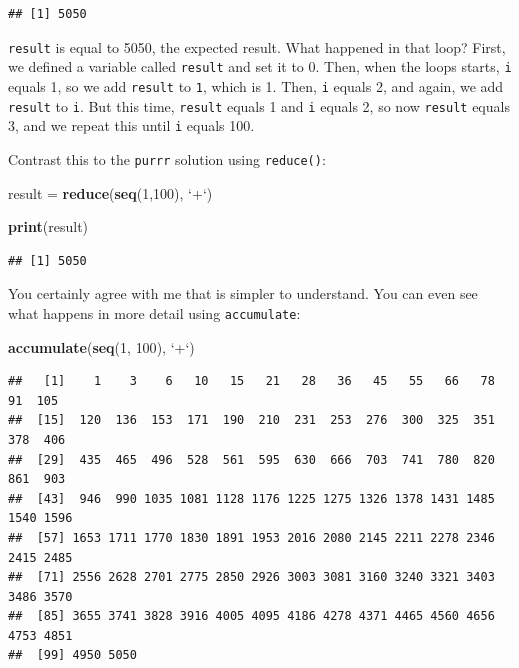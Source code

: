 \documentclass[]{gitbook}
\newenvironment{Shaded}{\begin{snugshade}}{\end{snugshade}}
\newcommand{\DataTypeTok}[1]{\textcolor[rgb]{0.13,0.29,0.53}{#1}}
\newcommand{\DecValTok}[1]{\textcolor[rgb]{0.00,0.00,0.81}{#1}}
\newcommand{\KeywordTok}[1]{\textcolor[rgb]{0.13,0.29,0.53}{\textbf{#1}}}
\newcommand{\NormalTok}[1]{#1}
\newcommand{\StringTok}[1]{\textcolor[rgb]{0.31,0.60,0.02}{#1}}
\theoremstyle{definition}
\theoremstyle{definition}
\theoremstyle{definition}
\theoremstyle{remark}
\begin{document}
\begin{verbatim}
## [1] 5050
\end{verbatim}

\texttt{result} is equal to 5050, the expected result. What happened in
that loop? First, we defined a variable called \texttt{result} and set
it to 0. Then, when the loops starts, \texttt{i} equals 1, so we add
\texttt{result} to \texttt{1}, which is 1. Then, \texttt{i} equals 2,
and again, we add \texttt{result} to \texttt{i}. But this time,
\texttt{result} equals 1 and \texttt{i} equals 2, so now \texttt{result}
equals 3, and we repeat this until \texttt{i} equals 100.

Contrast this to the \texttt{purrr} solution using \texttt{reduce()}:

\begin{Shaded}
\begin{Highlighting}[]
\NormalTok{result =}\StringTok{ }\KeywordTok{reduce}\NormalTok{(}\KeywordTok{seq}\NormalTok{(}\DecValTok{1}\NormalTok{,}\DecValTok{100}\NormalTok{), }\StringTok{`}\DataTypeTok{+}\StringTok{`}\NormalTok{)}

\KeywordTok{print}\NormalTok{(result)}
\end{Highlighting}
\end{Shaded}

\begin{verbatim}
## [1] 5050
\end{verbatim}

You certainly agree with me that is simpler to understand. You can even
see what happens in more detail using \texttt{accumulate}:

\begin{Shaded}
\begin{Highlighting}[]
\KeywordTok{accumulate}\NormalTok{(}\KeywordTok{seq}\NormalTok{(}\DecValTok{1}\NormalTok{, }\DecValTok{100}\NormalTok{), }\StringTok{`}\DataTypeTok{+}\StringTok{`}\NormalTok{)}
\end{Highlighting}
\end{Shaded}

\begin{verbatim}
##   [1]    1    3    6   10   15   21   28   36   45   55   66   78   91  105
##  [15]  120  136  153  171  190  210  231  253  276  300  325  351  378  406
##  [29]  435  465  496  528  561  595  630  666  703  741  780  820  861  903
##  [43]  946  990 1035 1081 1128 1176 1225 1275 1326 1378 1431 1485 1540 1596
##  [57] 1653 1711 1770 1830 1891 1953 2016 2080 2145 2211 2278 2346 2415 2485
##  [71] 2556 2628 2701 2775 2850 2926 3003 3081 3160 3240 3321 3403 3486 3570
##  [85] 3655 3741 3828 3916 4005 4095 4186 4278 4371 4465 4560 4656 4753 4851
##  [99] 4950 5050
\end{verbatim}
\end{document}
